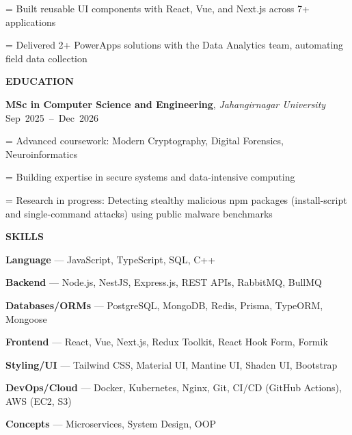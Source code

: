\documentclass[a4paper]{article}
\newcommand{\sectionfont}{%
  \fontsize{12pt}{14pt}\selectfont\bfseries
}
\newlength{\listindent}
\newcommand{\sectiontitle}[1]{%
  \par
  \vspace{14pt}
  {\sectionfont #1}\par
  \vspace{6pt}
}
\newlength{\bulletgap}
\newcommand{\resumebullet}[1]{%
  \begingroup
  \leftskip=\listindent
  \parindent=0pt
  \noindent
  \llap{%
    \raisebox{0.15ex}{%
      \fontsize{7}{7}\selectfont -
    }%
    \hspace{6pt}%
  }%
  #1\par
  \endgroup
  \vspace{\bulletgap}%
}
\newcommand{\skill}[2]{%
  \textbf{#1} --- #2\par
  \vspace{3pt}%
}
\begin{document}
\resumebullet{Built reusable UI components with React, Vue, and Next.js across 7+ applications}

\resumebullet{Delivered 2+ PowerApps solutions with the Data Analytics team, automating field data collection}


\sectiontitle{EDUCATION}

\textbf{MSc in Computer Science and Engineering},
\textit{Jahangirnagar University}%
\hfill
\mbox{Sep 2025 -- Dec 2026}\par

\vspace{1pt}

\resumebullet{Advanced coursework: Modern Cryptography, Digital Forensics, Neuroinformatics}

\resumebullet{Building expertise in secure systems and data-intensive computing}

\resumebullet{Research in progress: Detecting stealthy malicious npm packages (install-script and single-command attacks) using public malware benchmarks}


\sectiontitle{SKILLS}

\skill{Language}{JavaScript, TypeScript, SQL, C++}

\skill{Backend}{Node.js, NestJS, Express.js, REST APIs, RabbitMQ, BullMQ}

\skill{Databases/ORMs}{PostgreSQL, MongoDB, Redis, Prisma, TypeORM, Mongoose}

\skill{Frontend}{React, Vue, Next.js, Redux Toolkit, React Hook Form, Formik}

\skill{Styling/UI}{Tailwind CSS, Material UI, Mantine UI, Shadcn UI, Bootstrap}

\skill{DevOps/Cloud}{Docker, Kubernetes, Nginx, Git, CI/CD (GitHub Actions), AWS (EC2, S3)}

\skill{Concepts}{Microservices, System Design, OOP}


\newpage
\setlength{\bulletgap}{2pt}

\vspace*{-12pt}
\end{document}
